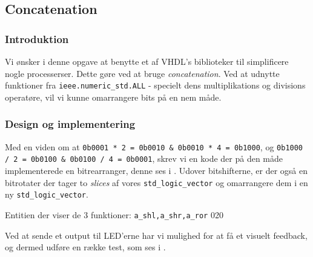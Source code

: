 

\subsection{Concatenation}

\subsubsection{Introduktion}
Vi ønsker i denne opgave at benytte et af VHDL's biblioteker til simplificere nogle processerser. Dette gøre ved at bruge \textit{concatenation}. Ved at udnytte funktioner fra \texttt{ieee.numeric\_std.ALL} - specielt dens multiplikations og divisions operatøre, vil vi kunne omarrangere bits på en nem måde.
\subsubsection{Design og implementering}


Med en viden om at \texttt{0b0001 * 2 = 0b0010 \& 0b0010 * 4 = 0b1000}, og \texttt{0b1000 / 2 = 0b0100 \& 0b0100 / 4 = 0b0001}, skrev vi en kode der på den måde implementerede en bitrearranger, denne ses i . Udover bitshifterne, er der også en bitrotater der tager to \textit{slices} af vores \texttt{std\_logic\_vector} og omarrangere dem i en ny \texttt{std\_logic\_vector}.

{Entitien der viser de 3 funktioner: \texttt{a\_shl,a\_shr,a\_ror}}
{0}{20}


Ved at sende et output til LED'erne har vi mulighed for at få et visuelt feedback, og dermed udføre en række test, som ses i .


